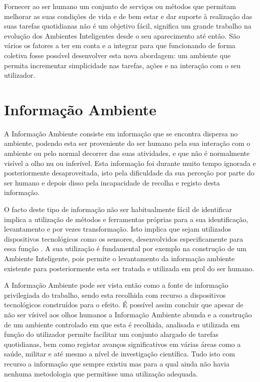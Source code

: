 Fornecer ao ser humano um conjunto de serviços ou métodos que permitam melhorar as suas condições de vida e de bem estar e dar suporte à realização das suas tarefas quotidianas não é um objetivo fácil, significa um grande trabalho na evolução dos Ambientes Inteligentes desde o seu aparecimento até então. São vários os fatores a ter em conta e a integrar para que funcionando de forma coletiva fosse possível desenvolver esta nova abordagem: um ambiente que permita incrementar simplicidade nas tarefas, ações e na interação com o seu utilizador.

\section{Informação Ambiente}
A Informação Ambiente \cite{bentley2007time} consiste em informação que se encontra dispersa no ambiente, podendo esta ser proveniente do ser humano pela sua interação com o ambiente ou pelo normal decorrer das suas atividades, e que não é normalmente visível a olho nu ou inferível. Esta informação foi durante muito tempo ignorada e posteriormente desaproveitada, isto pela dificuldade da sua perceção por parte do ser humano e depois disso pela incapacidade de recolha e registo desta informação.

O facto deste tipo de informação não ser habitualmente fácil de identificar implica a utilização de métodos e ferramentas próprias para a sua identificação, levantamento e por vezes transformação. Isto implica que sejam utilizados dispositivos tecnológicos como os sensores, desenvolvidos especificamente para essa função \cite{streitz2003situated}. A sua utilização é fundamental por exemplo na construção de um Ambiente Inteligente, pois permite o levantamento da informação ambiente existente para posteriormente esta ser tratada e utilizada em prol do ser humano\cite{pimenta2013monitoring}. 

A Informação Ambiente pode ser vista então como a fonte de informação privilegiada do trabalho, sendo esta recolhida com recurso a dispositivos tecnológicos construídos para o efeito. É possível assim concluir que apesar de não ser vísivel aos olhos humanos a Informação Ambiente abunda e a construção de um ambiente controlado em que esta é recolhida, analisada e utilizada em função do utilizador permite facilitar um conjunto alargado de tarefas quotidianas, bem como registar avanços significativos em várias áreas como a saúde, militar e até mesmo a nível de investigação científica. Tudo isto com recurso a informação que sempre existiu mas para a qual ainda não havia nenhuma metodologia que permitisse uma utilização adequada.

